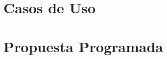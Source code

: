 \documentclass[10pt]{book}
\begin{document}
	
	\chapter{Casos de Uso}
	\label{chapter:casos}
	
	
	
	
	
	\chapter{Propuesta Programada}
	\label{chapter:propuesta}
	
	
	
	
	
	
	
\end{document}
